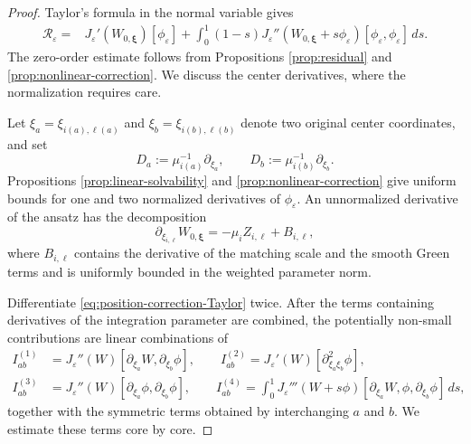 \documentclass[11pt]{article}
\numberwithin{equation}{section}
\begin{document}
\begin{proof}
Taylor's formula in the normal variable gives
\begin{equation}\label{eq:position-correction-Taylor}
\begin{aligned}
\mathcal R_\varepsilon
={}&J_\varepsilon'(W_{0,\boldsymbol\xi})
[\phi_\varepsilon]
+\int_0^1(1-s)
J_\varepsilon''(W_{0,\boldsymbol\xi}+s\phi_\varepsilon)
[\phi_\varepsilon,\phi_\varepsilon] \,ds.
\end{aligned}
\end{equation}
The zero-order estimate follows from Propositions \ref{prop:residual}
and \ref{prop:nonlinear-correction}. We discuss the center derivatives,
where the normalization requires care.

Let $\xi_a=\xi_{i(a),\ell(a)}$ and
$\xi_b=\xi_{i(b),\ell(b)}$ denote two original center coordinates, and
set
\[
D_a:=\mu_{i(a)}^{-1}\partial_{\xi_a},
\qquad
D_b:=\mu_{i(b)}^{-1}\partial_{\xi_b}.
\]
Propositions \ref{prop:linear-solvability} and
\ref{prop:nonlinear-correction} give uniform bounds for one and two
normalized derivatives of $\phi_\varepsilon$. An unnormalized
derivative of the ansatz has the decomposition
\[
\partial_{\xi_{i,\ell}}W_{0,\boldsymbol\xi}
=-\mu_i Z_{i,\ell}+B_{i,\ell},
\]
where $B_{i,\ell}$ contains the derivative of the matching scale and
the smooth Green terms and is uniformly bounded in the weighted
parameter norm.

Differentiate \eqref{eq:position-correction-Taylor} twice. After the
terms containing derivatives of the integration parameter are
combined, the potentially non-small contributions are linear
combinations of
\begin{align*}
I_{ab}^{(1)}&=J_\varepsilon''(W)
[\partial_{\xi_a}W,\partial_{\xi_b}\phi],\qquad
I_{ab}^{(2)}=J_\varepsilon'(W)
[\partial_{\xi_a\xi_b}^2\phi],\\
I_{ab}^{(3)}&=J_\varepsilon''(W)
[\partial_{\xi_a}\phi,\partial_{\xi_b}\phi],\qquad
I_{ab}^{(4)}=\int_0^1J_\varepsilon'''(W+s\phi)
[\partial_{\xi_a}W,\phi,
\partial_{\xi_b}\phi]\,ds,
\end{align*}
together with the symmetric terms obtained by interchanging $a$ and
$b$. We estimate these terms core by core.


\end{proof}
\end{document}
